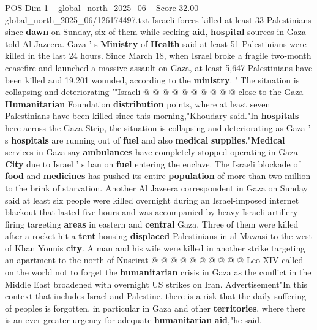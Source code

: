 \begin{textsample}{POS Dim 1 – global\_north\_2025\_06 – Score 32.00 – global\_north\_2025\_06/126174497.txt}
Israeli forces killed at least 33 Palestinians since \textbf{dawn} on Sunday, six of them while seeking \textbf{aid}, \textbf{hospital} sources in Gaza told Al Jazeera.
Gaza ' s \textbf{Ministry} of \textbf{Health} said at least 51 Palestinians were killed in the last 24 hours.
Since March 18, when Israel broke a fragile two-month ceasefire and launched a massive assault on Gaza, at least 5,647 Palestinians have been killed and 19,201 wounded, according to the \textbf{ministry}. ' The situation is collapsing and deteriorating '"Israeli @ @ @ @ @ @ @ @ @ @ close to the Gaza \textbf{Humanitarian} Foundation \textbf{distribution} points, where at least seven Palestinians have been killed since this morning,"Khoudary said."In \textbf{hospitals} here across the Gaza Strip, the situation is collapsing and deteriorating as Gaza ' s \textbf{hospitals} are running out of \textbf{fuel} and also \textbf{medical} \textbf{supplies}."\textbf{Medical} services in Gaza say \textbf{ambulances} have completely stopped operating in Gaza \textbf{City} due to Israel ' s ban on \textbf{fuel} entering the enclave.
The Israeli blockade of \textbf{food} and \textbf{medicines} has pushed its entire \textbf{population} of more than two million to the brink of starvation.
Another Al Jazeera correspondent in Gaza on Sunday said at least six people were killed overnight during an Israel-imposed internet blackout that lasted five hours and was accompanied by heavy Israeli artillery firing targeting \textbf{areas} in eastern and \textbf{central} Gaza.
Three of them were killed after a rocket hit a \textbf{tent} housing \textbf{displaced} Palestinians in al-Mawasi to the west of Khan Younis \textbf{city}.
A man and his wife were killed in another strike targeting an apartment to the north of Nuseirat @ @ @ @ @ @ @ @ @ @ Leo XIV called on the world not to forget the \textbf{humanitarian} crisis in Gaza as the conflict in the Middle East broadened with overnight US strikes on Iran.
Advertisement"In this context that includes Israel and Palestine, there is a risk that the daily suffering of peoples is forgotten, in particular in Gaza and other \textbf{territories}, where there is an ever greater urgency for adequate \textbf{humanitarian} \textbf{aid},"he said.

\end{textsample}

